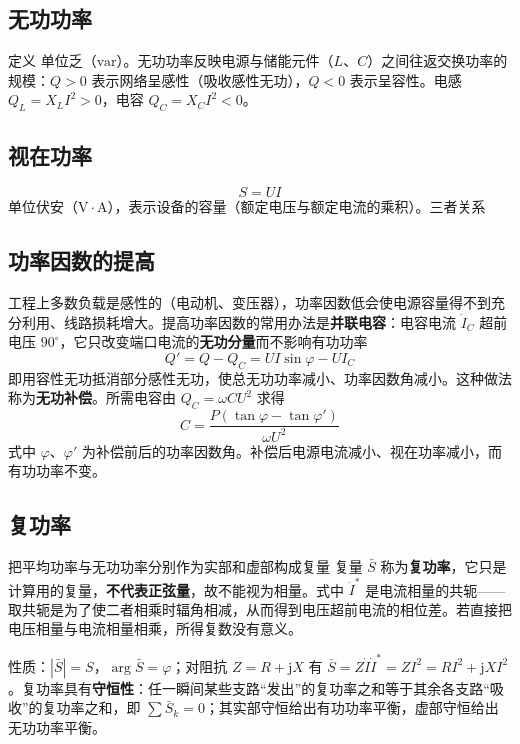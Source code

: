 \subsection{无功功率}
定义
单位乏（$\mathrm{var}$）。无功功率反映电源与储能元件（$L$、$C$）之间往返交换功率的规模：$Q>0$ 表示网络呈感性（吸收感性无功），$Q<0$ 表示呈容性。电感 $Q_L=X_LI^2>0$，电容 $Q_C=X_CI^2<0$。

\subsection{视在功率}
\begin{equation}
S=UI
\end{equation}
单位伏安（$\mathrm{V\cdot A}$），表示设备的容量（额定电压与额定电流的乘积）。三者关系

\subsection{功率因数的提高}
工程上多数负载是感性的（电动机、变压器），功率因数低会使电源容量得不到充分利用、线路损耗增大。提高功率因数的常用办法是\textbf{并联电容}：电容电流 $\dot{I}_C$ 超前电压 $90^\circ$，它只改变端口电流的\textbf{无功分量}而不影响有功功率
\begin{equation}
Q'=Q-Q_C=UI\sin\varphi-UI_C
\end{equation}
即用容性无功抵消部分感性无功，使总无功功率减小、功率因数角减小。这种做法称为\textbf{无功补偿}。所需电容由 $Q_C=\omega CU^2$ 求得
\begin{equation}
C=\frac{P\left(\tan\varphi-\tan\varphi'\right)}{\omega U^2}
\end{equation}
式中 $\varphi$、$\varphi'$ 为补偿前后的功率因数角。补偿后电源电流减小、视在功率减小，而有功功率不变。

\subsection{复功率}
把平均功率与无功功率分别作为实部和虚部构成复量
复量 $\bar{S}$ 称为\textbf{复功率}，它只是计算用的复量，\textbf{不代表正弦量}，故不能视为相量。式中 $\dot{I}^{*}$ 是电流相量的共轭——取共轭是为了使二者相乘时辐角相减，从而得到电压超前电流的相位差。若直接把电压相量与电流相量相乘，所得复数没有意义。

性质：$|\bar{S}|=S$，$\arg\bar{S}=\varphi$；对阻抗 $Z=R+\mathrm{j}X$ 有 $\bar{S}=Z\dot{I}\dot{I}^{*}=ZI^2=RI^2+\mathrm{j}XI^2$。复功率具有\textbf{守恒性}：任一瞬间某些支路“发出”的复功率之和等于其余各支路“吸收”的复功率之和，即 $\sum\bar{S}_k=0$；其实部守恒给出有功功率平衡，虚部守恒给出无功功率平衡。

